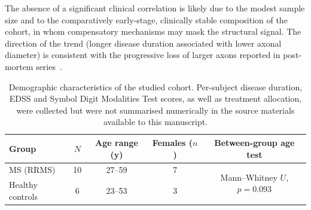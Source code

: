 \documentclass[11pt]{article}
\begin{document}
The absence of a significant clinical correlation is likely due to the modest sample size and to the comparatively early-stage, clinically stable composition of the cohort, in whom compensatory mechanisms may mask the structural signal. The direction of the trend (longer disease duration associated with lower axonal diameter) is consistent with the progressive loss of larger axons reported in post-mortem series~\cite{tallantyre2010demyelinated,bergers2002axonal}.

\begin{table}[htbp]
\centering
\caption{Demographic characteristics of the studied cohort. Per-subject disease duration, EDSS and Symbol Digit Modalities Test scores, as well as treatment allocation, were collected but were not summarised numerically in the source materials available to this manuscript.}
\label{tab:cohort}
\begin{tabular}{lcccc}
\toprule
Group & $N$ & Age range (y) & Females ($n$) & Between-group age test \\
\midrule
MS (RRMS)        & 10 & 27--59 & 7 & \multirow{2}{*}{Mann--Whitney $U$, $p=0.093$} \\
Healthy controls &  6 & 23--53 & 3 &                                                 \\
\bottomrule
\end{tabular}
\end{table}
\end{document}
